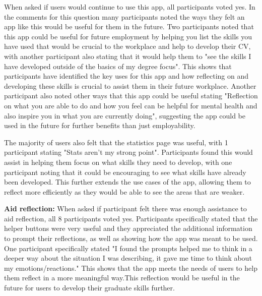 \documentclass{l4proj}
\begin{document}
When asked if users would continue to use this app, all participants voted yes. In the comments for this question many participants noted the ways they felt an app like this would be useful for them in the future. Two participants noted that this app could be useful for future employment by helping you list the skills you have used that would be crucial to the workplace and help to develop their CV, with another participant also stating that it would help them to "see the skills I have developed outside of the basics of my degree focus". This shows that participants have identified the key uses for this app and how reflecting on and developing these skills is crucial to assist them in their future workplace. Another participant also noted other ways that this app could be useful stating "Reflection on what you are able to do and how you feel can be helpful for mental health and also inspire you in what you are currently doing", suggesting the app could be used in the future for further benefits than just employability.
 
The majority of users also felt that the statistics page was useful, with 1 participant stating "Stats aren't my strong point". Participants found this would assist in helping them focus on what skills they need to develop, with one participant noting that it could be encouraging to see what skills have already been developed. This further extends the use cases of the app, allowing them to reflect more efficiently as they would be able to see the areas that are weaker. 

\textbf{Aid reflection:} When asked if participant felt there was enough assistance to aid reflection, all 8 participants voted yes. Participants specifically stated that the helper buttons were very useful and they appreciated the additional information to prompt their reflections, as well as showing how the app was meant to be used. One participant specifically stated "I found the prompts helped me to think in a deeper way about the situation I was describing, it gave me time to think about my emotions/reactions." This shows that the app meets the needs of users to help them reflect in a more meaningful way.This reflection would be useful in the future for users to develop their graduate skills further.
\end{document}
